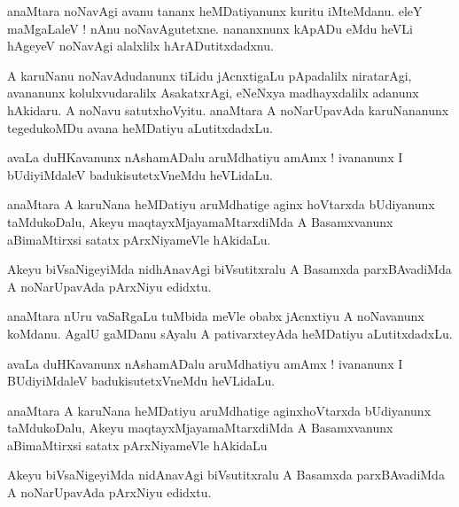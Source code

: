 \documentclass{article}
\begin{document}
\begin{mn}
anaMtara  noNavAgi  avanu  tananx  heMDatiyanunx  kuritu  iMteMdanu.  eleY  maMgaLaleV !  nAnu  noNavAgutetxne.  
nananxnunx  kApADu  eMdu  heVLi  hAgeyeV  noNavAgi  alalxlilx  hArADutitxdadxnu.
\end{mn}

\begin{mn}
A  karuNanu  noNavAdudanunx  tiLidu  jAcnxtigaLu  pApadalilx  niratarAgi,  avananunx  kolulxvudaralilx  
AsakatxrAgi,  eNeNxya  madhayxdalilx  adanunx  hAkidaru.  A  noNavu  satutxhoVyitu.  anaMtara  A  
noNarUpavAda  karuNananunx  tegedukoMDu  avana  heMDatiyu  aLutitxdadxLu.
\end{mn}

\begin{mn}
avaLa  duHKavanunx  nAshamADalu  aruMdhatiyu  amAmx !  ivananunx  I  bUdiyiMdaleV  badukisutetxVneMdu  heVLidaLu.
\end{mn}

\begin{mn}
anaMtara  A  karuNana  heMDatiyu  aruMdhatige  aginx  hoVtarxda  bUdiyanunx  taMdukoDalu,  Akeyu   
maqtayxMjayamaMtarxdiMda  A  Basamxvanunx  aBimaMtirxsi  satatx  pArxNiyameVle  hAkidaLu.
\end{mn}

\begin{mn}
Akeyu  biVsaNigeyiMda  nidhAnavAgi  biVsutitxralu  A  Basamxda  parxBAvadiMda  A  noNarUpavAda  pArxNiyu  edidxtu.
\end{mn}

\begin{mn}
anaMtara  nUru  vaSaRgaLu  tuMbida  meVle  obabx  jAcnxtiyu  A  noNavanunx  koMdanu.  AgalU  gaMDanu  
sAyalu  A  pativarxteyAda  heMDatiyu  aLutitxdadxLu.
\end{mn}

\begin{mn}
avaLa duHKavanunx  nAshamADalu  aruMdhatiyu  amAmx !  ivananunx  I  BUdiyiMdaleV  badukisutetxVneMdu  heVLidaLu.
\end{mn}

\begin{mn}
anaMtara  A  karuNana  heMDatiyu  aruMdhatige  aginxhoVtarxda  bUdiyanunx  taMdukoDalu,  Akeyu  maqtayxMjayamaMtarxdiMda  
A  Basamxvanunx  aBimaMtirxsi  satatx  pArxNiyameVle  hAkidaLu
\end{mn}

\begin{mn}
Akeyu  biVsaNigeyiMda  nidAnavAgi  biVsutitxralu  A  Basamxda  parxBAvadiMda  A  noNarUpavAda  pArxNiyu  edidxtu.
\end{mn}
\end{document}
